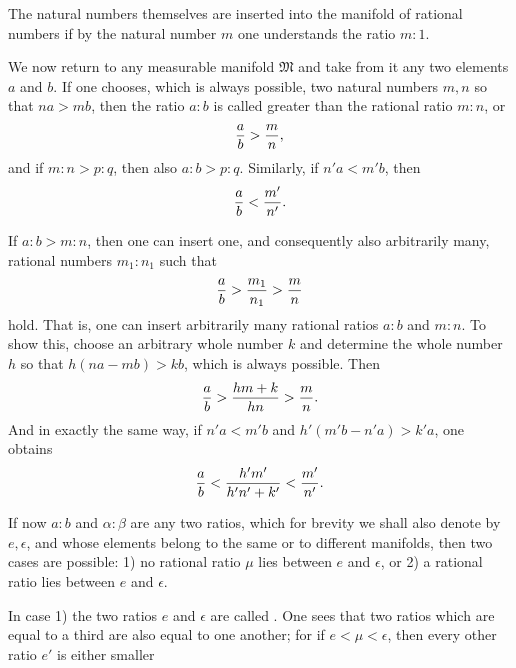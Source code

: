 
The natural numbers themselves are inserted into the manifold of
rational numbers if by the natural number $m$ one understands the
ratio $m:1$.

We now return to any measurable manifold $\mathfrak M$ and take from
it any two elements $a$ and $b$. If one chooses, which is always
possible, two natural numbers $m,n$ so that $na>mb$, then the ratio
$a:b$ is called greater than the rational ratio $m:n$, or
\[
 {a\over b}>{m\over n},
\]
and if $m:n>p:q$, then also $a:b>p:q$. Similarly, if $n'a<m'b$, then
\[
 {a\over b}<{m'\over n'}.
\]

If $a:b>m:n$, then one can insert one, and consequently also
arbitrarily many, rational numbers $m_1:n_1$ such that
\[
 {a\over b}>{m_1\over n_1}>{m\over n}
\]
hold. That is, one can insert arbitrarily many rational ratios
 $a:b$ and $m:n$. To show this, choose an arbitrary
whole number $k$ and determine the whole number $h$ so that
$h(na-mb)>kb$, which is always possible. Then
\[
 {a\over b}>{hm+k\over hn}>{m\over n}.
\]
And in exactly the same way, if $n'a<m'b$ and
$h'(m'b-n'a)>k'a$, one obtains
\[
 {a\over b}<{h'm'\over h'n'+k'}<{m'\over n'}.
\]

If now $a:b$ and $\alpha:\beta$ are any two ratios, which for brevity
we shall also denote by $e,\epsilon$, and whose elements belong to the
same or to different manifolds, then two cases are possible: 1) no
rational ratio $\mu$ lies between $e$ and $\epsilon$, or 2) a rational
ratio lies between $e$ and $\epsilon$.

In case 1) the two ratios $e$ and $\epsilon$ are called
. One sees that two ratios which are
equal to a third are also equal to one another; for if
$e<\mu<\epsilon$, then every other ratio $e'$ is either smaller
